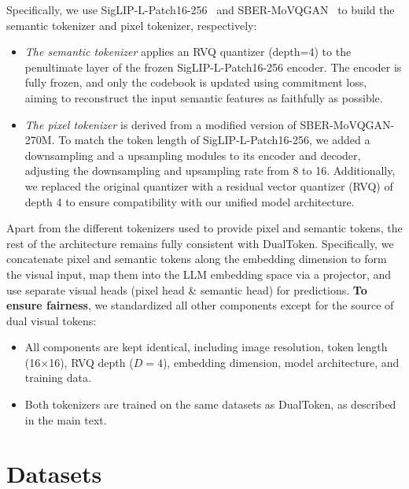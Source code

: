 Specifically, we use SigLIP-L-Patch16-256~\citep{zhai2023siglip} and SBER-MoVQGAN~\citep{sber2023movqgan} to build the semantic tokenizer and pixel tokenizer, respectively:
\begin{itemize}[leftmargin=*]
    \item \textit{The semantic tokenizer} applies an RVQ quantizer (depth=4) to the penultimate layer of the frozen SigLIP-L-Patch16-256 encoder. The encoder is fully frozen, and only the codebook is updated using commitment loss, aiming to reconstruct the input semantic features as faithfully as possible.
    \item \textit{The pixel tokenizer} is derived from a modified version of SBER-MoVQGAN-270M. To match the token length of SigLIP-L-Patch16-256, we added a downsampling and a upsampling modules to its encoder and decoder, adjusting the downsampling and upsampling rate from 8 to 16. Additionally, we replaced the original quantizer with a residual vector quantizer (RVQ) of depth 4 to ensure compatibility with our unified model architecture.
\end{itemize}

Apart from the different tokenizers used to provide pixel and semantic tokens, the rest of the architecture remains fully consistent with DualToken. Specifically, we concatenate pixel and semantic tokens along the embedding dimension to form the visual input, map them into the LLM embedding space via a projector, and use separate visual heads (pixel head \& semantic head) for predictions.
\textbf{To ensure fairness}, we standardized all other components except for the source of dual visual tokens:
\begin{itemize}[leftmargin=*]
    \item All components are kept identical, including image resolution, token length (16×16), RVQ depth ($D=4$), embedding dimension, model architecture, and training data.
    \item Both tokenizers are trained on the same datasets as DualToken, as described in the main text.
\end{itemize}


\section{Datasets}
\label{appendix_data}

